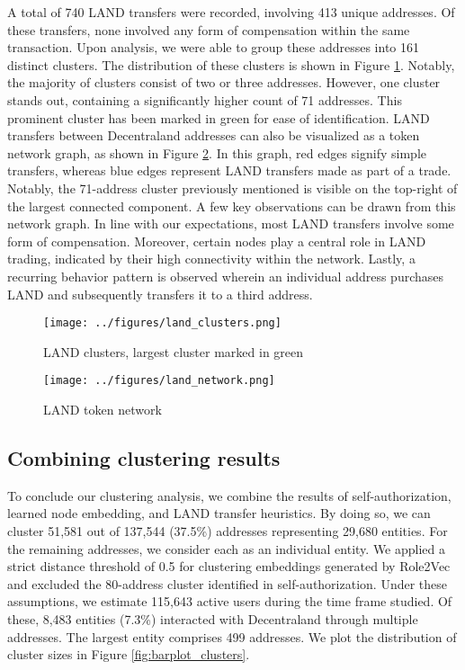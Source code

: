 \documentclass[12pt,a4paper,titlepage,oneside,english]{article}
\begin{document}
A total of 740 LAND transfers were recorded, involving 413 unique addresses. Of these transfers, none involved any form of compensation within the same transaction. Upon analysis, we were able to group these addresses into 161 distinct clusters. The distribution of these clusters is shown in Figure \ref{fig:LAND_clusters}. Notably, the majority of clusters consist of two or three addresses. However, one cluster stands out, containing a significantly higher count of 71 addresses. This prominent cluster has been marked in green for ease of identification. \newline
LAND transfers between Decentraland addresses can also be visualized as a token network graph, as shown in Figure \ref{fig:LAND_network}. In this graph, red edges signify simple transfers, whereas blue edges represent LAND transfers made as part of a trade. Notably, the 71-address cluster previously mentioned is visible on the top-right of the largest connected component. \newline
A few key observations can be drawn from this network graph. In line with our expectations, most LAND transfers involve some form of compensation. Moreover, certain nodes play a central role in LAND trading, indicated by their high connectivity within the network. Lastly, a recurring behavior pattern is observed wherein an individual address purchases LAND and subsequently transfers it to a third address.

\begin{figure}[h!]
	\centering
	\texttt{[image: ../figures/land\_clusters.png]}
	\caption{LAND clusters, largest cluster marked in green}
	\label{fig:LAND_clusters}
\end{figure}

\begin{figure}[h!]
	\centering
	\texttt{[image: ../figures/land\_network.png]}
	\caption{LAND token network}
	\label{fig:LAND_network}
\end{figure} 

\subsection{Combining clustering results}
To conclude our clustering analysis, we combine the results of self-authorization, learned node embedding, and LAND transfer heuristics. By doing so, we can cluster 51,581 out of 137,544 (37.5\%) addresses representing 29,680 entities. 
For the remaining addresses, we consider each as an individual entity. 
We applied a strict distance threshold of 0.5 for clustering embeddings generated by Role2Vec and excluded the 80-address cluster identified in self-authorization.
Under these assumptions, we estimate 115,643 active users during the time frame studied. Of these, 8,483 entities (7.3\%) interacted with Decentraland through multiple addresses. The largest entity comprises 499 addresses. We plot the distribution of cluster sizes in Figure \ref{fig:barplot_clusters}.
\end{document}
